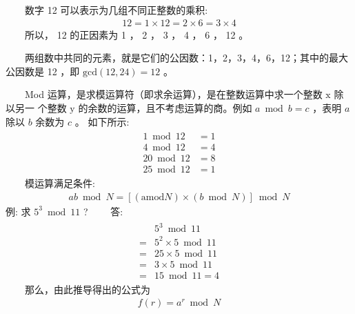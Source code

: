 \documentclass[a4paper,11pt,english]{sphinxmanual}
\begin{document}
\sphinxAtStartPar
  数字 12 可以表示为几组不同正整数的乘积:
\begin{equation*}
\begin{split}12=1 \times 12=2 \times 6=3 \times 4\end{split}
\end{equation*}
\sphinxAtStartPar
  所以， 12 的正因素为 1 ， 2 ， 3 ， 4 ， 6 ， 12 。

\sphinxAtStartPar
  两组数中共同的元素，就是它们的公因数：1，2，3，4，6，12；其中的最大公因数是 12 ，即  \(\text{gcd}(12, 24)=12\) 。

\sphinxAtStartPar
{}

\sphinxAtStartPar
  Mod 运算，是求模运算符（即求余运算），是在整数运算中求一个整数  \(\mathrm{x}\) 除以另一 个整数  \(\mathrm{y}\) 的余数的运算，且不考虑运算的商。例如  \(a \bmod b=c\) ，表明  \({a}\) 除以  \({b}\) 余数为  \({c}\) 。 如下所示:
\begin{equation*}
\begin{split}\begin{aligned} 1 \bmod 12 &=1 \\ 4 \bmod 12 &=4 \\ 20 \bmod 12 &=8 \\ 25 \bmod 12 &=1 \end{aligned}\end{split}
\end{equation*}
\sphinxAtStartPar
  模运算满足条件:
\begin{equation*}
\begin{split}a b \bmod N=[(\text{amod} N) \times(b \bmod N)] \bmod N\end{split}
\end{equation*}
\sphinxAtStartPar
例: 求  \(5^{3} \bmod 11\) ?   答:
\begin{equation*}
\begin{split}\begin{aligned} & 5^{3} \bmod 11 \\ =& 5^{2} \times 5 \bmod 11 \\ =& 25 \times 5 \bmod 11 \\ =& 3 \times 5 \bmod 11 \\ =& 15 \bmod 11=4 \end{aligned}\end{split}
\end{equation*}
\sphinxAtStartPar
  那么，由此推导得出的公式为
\begin{equation*}
\begin{split}f(r)=a^{r} \bmod N\end{split}
\end{equation*}
\sphinxAtStartPar
{}
\end{document}
